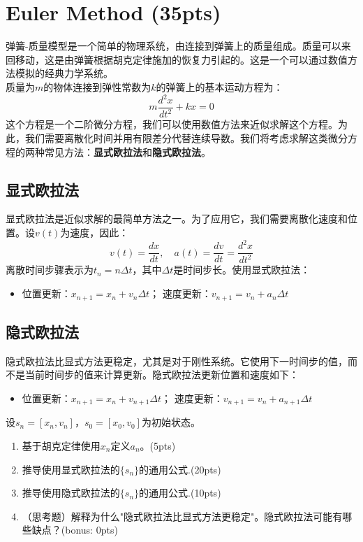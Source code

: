 \section{Euler Method (35pts)}
弹簧-质量模型是一个简单的物理系统，由连接到弹簧上的质量组成。质量可以来回移动，这是由弹簧根据胡克定律施加的恢复力引起的。这是一个可以通过数值方法模拟的经典力学系统。\\
质量为$m$的物体连接到弹性常数为$k$的弹簧上的基本运动方程为：
\[
m \frac{d^2x}{dt^2} + kx = 0
\]
这个方程是一个二阶微分方程，我们可以使用数值方法来近似求解这个方程。为此，我们需要离散化时间并用有限差分代替连续导数。我们将考虑求解这类微分方程的两种常见方法：\textbf{显式欧拉法}和\textbf{隐式欧拉法}。
\subsection*{显式欧拉法}
显式欧拉法是近似求解的最简单方法之一。为了应用它，我们需要离散化速度和位置。设$v(t)$为速度，因此：
\[
v(t) = \frac{dx}{dt}, \quad a(t) = \frac{dv}{dt} = \frac{d^2x}{dt^2}
\]
离散时间步骤表示为$t_n = n \Delta t$，其中$\Delta t$是时间步长。使用显式欧拉法：
\begin{itemize}
	\item 位置更新：$x_{n+1} = x_n + v_n \Delta t$；    速度更新：$v_{n+1} = v_n + a_n \Delta t$
\end{itemize}
\subsection*{隐式欧拉法}
隐式欧拉法比显式方法更稳定，尤其是对于刚性系统。它使用下一时间步的值，而不是当前时间步的值来计算更新。隐式欧拉法更新位置和速度如下：
\begin{itemize}
	\item 位置更新：$x_{n+1} = x_n + v_{n+1} \Delta t$；    速度更新：$v_{n+1} = v_n + a_{n+1} \Delta t$
\end{itemize}
设$s_n = [x_n, v_n]$，$s_0 = [x_0, v_0]$为初始状态。
\begin{enumerate}
	\item 基于胡克定律使用$x_n$定义$a_n$。(5pts)
	\item 推导使用显式欧拉法的$\{s_n\}$的通用公式.(20pts)
	\item 推导使用隐式欧拉法的$\{s_n\}$的通用公式.(10pts)
	\item （思考题）解释为什么"隐式欧拉法比显式方法更稳定"。隐式欧拉法可能有哪些缺点？(bonus: 0pts)
\end{enumerate}
